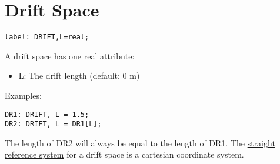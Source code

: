 
\section{Drift Space}
\label{sec:drift}

\begin{verbatim}
label: DRIFT,L=real;
\end{verbatim} 

A drift space has one real attribute: 
\begin{itemize}
   \item L: The drift length (default: 0 m) 
\end{itemize} 

Examples: 
\begin{verbatim}
DR1: DRIFT, L = 1.5;
DR2: DRIFT, L = DR1[L];
\end{verbatim} 

The length of DR2 will always be equal to the length of DR1. The
\href{../Introduction/local_system.html#straight}{straight reference
  system} for a drift space is a cartesian coordinate system.  

